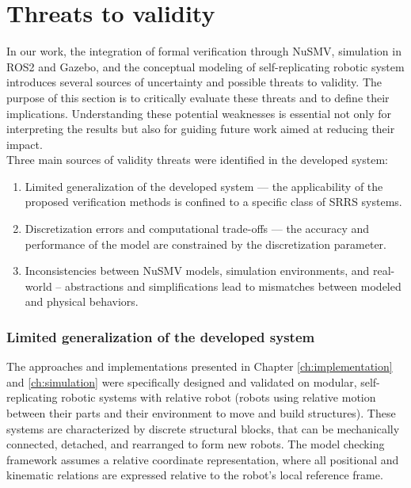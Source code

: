 \section{Threats to validity}

In our work, the integration of formal verification through 
NuSMV, simulation in ROS2 and Gazebo, and the conceptual modeling of 
self-replicating robotic system introduces several sources of 
uncertainty and possible threats to validity.
The purpose of this section is to critically evaluate these threats and 
to define their implications.
Understanding these potential weaknesses is essential not only for interpreting 
the results  but also for guiding future work aimed at reducing their 
impact. \\

Three main sources of validity threats were identified 
in the developed system:
\begin{enumerate}
    \item Limited generalization of the developed system — the applicability of 
    the proposed verification methods is confined to a specific class of 
    SRRS systems.
    \item Discretization errors and computational trade-offs — the accuracy and 
    performance of the model are constrained by the discretization parameter.
    \item Inconsistencies between NuSMV models, simulation environments, and real-world 
    -- abstractions and simplifications lead to mismatches between modeled 
    and physical behaviors.
\end{enumerate}

\subsubsection{ Limited generalization of the developed system }

The approaches and implementations presented in Chapter \ref{ch:implementation} and \ref{ch:simulation}
were specifically designed and validated on modular, self-replicating robotic 
systems with relative robot (robots using relative motion between their parts 
and their environment to move and build structures). 
These systems are characterized by discrete structural blocks,
that can be mechanically connected, detached, and rearranged to form new robots.
The model checking framework assumes a 
relative coordinate representation, where all positional and kinematic relations 
are expressed relative to the robot's local reference frame.

